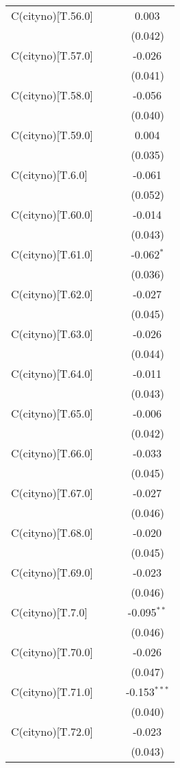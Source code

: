 \begin{table}[!htbp]
\begin{tabular}{@{\extracolsep{5pt}}lccc}
 C(cityno)[T.56.0] & & & 0.003$^{}$ \\
& & & (0.042) \\
 C(cityno)[T.57.0] & & & -0.026$^{}$ \\
& & & (0.041) \\
 C(cityno)[T.58.0] & & & -0.056$^{}$ \\
& & & (0.040) \\
 C(cityno)[T.59.0] & & & 0.004$^{}$ \\
& & & (0.035) \\
 C(cityno)[T.6.0] & & & -0.061$^{}$ \\
& & & (0.052) \\
 C(cityno)[T.60.0] & & & -0.014$^{}$ \\
& & & (0.043) \\
 C(cityno)[T.61.0] & & & -0.062$^{*}$ \\
& & & (0.036) \\
 C(cityno)[T.62.0] & & & -0.027$^{}$ \\
& & & (0.045) \\
 C(cityno)[T.63.0] & & & -0.026$^{}$ \\
& & & (0.044) \\
 C(cityno)[T.64.0] & & & -0.011$^{}$ \\
& & & (0.043) \\
 C(cityno)[T.65.0] & & & -0.006$^{}$ \\
& & & (0.042) \\
 C(cityno)[T.66.0] & & & -0.033$^{}$ \\
& & & (0.045) \\
 C(cityno)[T.67.0] & & & -0.027$^{}$ \\
& & & (0.046) \\
 C(cityno)[T.68.0] & & & -0.020$^{}$ \\
& & & (0.045) \\
 C(cityno)[T.69.0] & & & -0.023$^{}$ \\
& & & (0.046) \\
 C(cityno)[T.7.0] & & & -0.095$^{**}$ \\
& & & (0.046) \\
 C(cityno)[T.70.0] & & & -0.026$^{}$ \\
& & & (0.047) \\
 C(cityno)[T.71.0] & & & -0.153$^{***}$ \\
& & & (0.040) \\
 C(cityno)[T.72.0] & & & -0.023$^{}$ \\
& & & (0.043) \\

\end{tabular}
\end{table}
